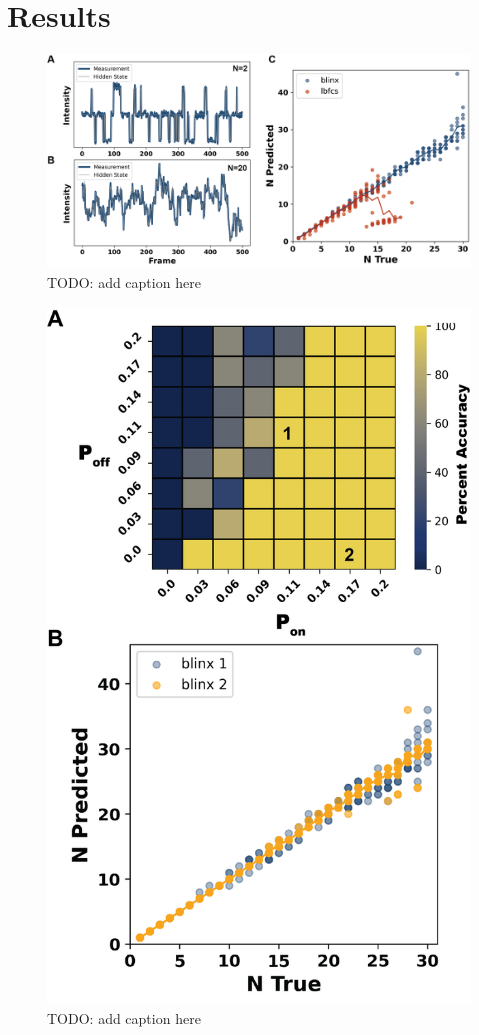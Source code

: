 \section{Results}

\begin{figure}[ht]
  \includegraphics[width=\linewidth]{figures/comparison_lbfcs}
  \caption{TODO: add caption here}
  \label{fig:results:comparison}
\end{figure}

\begin{figure}[ht]
  \includegraphics[width=\linewidth]{figures/kinetic_regime}
  \caption{TODO: add caption here}
  \label{fig:results:regime}
\end{figure}

